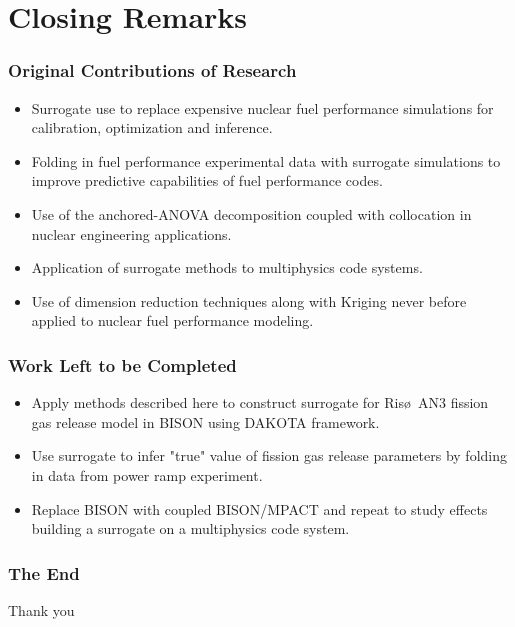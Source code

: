 \documentclass{beamer}
\begin{document}
\section{Closing Remarks}

\begin{frame}
\frametitle{Original Contributions of Research}

\begin{itemize}
  \item Surrogate use to replace expensive nuclear fuel performance simulations for calibration, optimization and inference.
  \item Folding in fuel performance experimental data with surrogate simulations to improve predictive capabilities of fuel performance codes.  
  \item Use of the anchored-ANOVA decomposition coupled with collocation in nuclear engineering applications.
  \item Application of surrogate methods to multiphysics code systems. 
  \item Use of dimension reduction techniques along with Kriging never before applied to nuclear fuel performance modeling.   
\end{itemize}

\end{frame}
\begin{frame}
\frametitle{Work Left to be Completed}

\begin{itemize}
  \item Apply methods described here to construct surrogate for Ris\o~AN3 fission gas release model in BISON using DAKOTA framework.
  \item Use surrogate to infer "true" value of fission gas release parameters by folding in  data from power ramp experiment.
  \item Replace BISON with coupled BISON/MPACT and repeat to study effects building a surrogate on a multiphysics code system.        
\end{itemize}

\end{frame}
\begin{frame}
\frametitle{The End}

\centering
Thank you

\end{frame}
\end{document}

